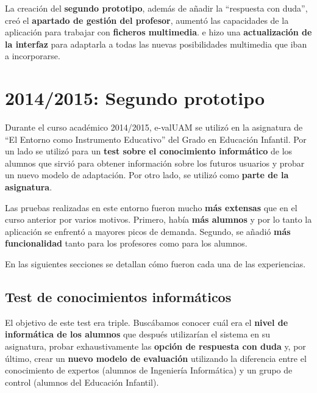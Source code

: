 La creación del \textbf{segundo prototipo}, además de añadir la ``respuesta con duda'', creó el \textbf{apartado de gestión del profesor}, aumentó las capacidades de la aplicación para trabajar con \textbf{ficheros multimedia}. e hizo una \textbf{actualización de la interfaz} para adaptarla a todas las nuevas posibilidades multimedia que iban a incorporarse.

\section{2014/2015: Segundo prototipo}

Durante el curso académico 2014/2015, \acrshort{e-valUAM} se utilizó en la asignatura de ``El Entorno como Instrumento Educativo'' del Grado en Educación Infantil. Por un lado se utilizó para un \textbf{test sobre el conocimiento informático} de los alumnos que sirvió para obtener información sobre los futuros usuarios y probar un nuevo modelo de adaptación. Por otro lado, se utilizó como \textbf{ parte de la asignatura}.

Las pruebas realizadas en este entorno fueron mucho \textbf{más extensas} que en el curso anterior por varios motivos. Primero, había \textbf{más alumnos} y por lo tanto la aplicación se enfrentó a mayores picos de demanda. Segundo, se añadió \textbf{más funcionalidad} tanto para los profesores como para los alumnos.

En las siguientes secciones se detallan cómo fueron cada una de las experiencias.

\subsection{Test de conocimientos informáticos}

El objetivo de este test era triple. Buscábamos conocer cuál era el\textbf{ nivel de informática de los alumnos} que después utilizarían el sistema en su asignatura, probar exhaustivamente las \textbf{opción de respuesta con duda} y, por último, crear un \textbf{nuevo modelo de evaluación} utilizando la diferencia entre el conocimiento de expertos (alumnos de Ingeniería Informática) y un grupo de control (alumnos del Educación Infantil).

